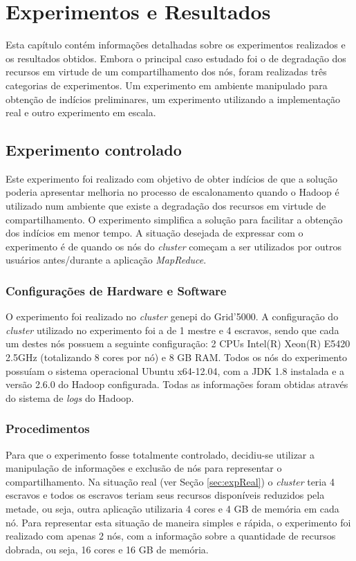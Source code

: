 \chapter{Experimentos e Resultados}
\label{chap:ExpRes}
Esta capítulo contém informações detalhadas sobre os experimentos realizados e os resultados obtidos. Embora o principal caso estudado foi o de degradação dos recursos em virtude de um compartilhamento dos nós, foram realizadas três categorias de experimentos. Um experimento em ambiente manipulado para obtenção de indícios preliminares, um experimento utilizando a implementação real e outro experimento em escala.

\section{Experimento controlado}
Este experimento foi realizado com objetivo de obter indícios de que a solução poderia apresentar melhoria no processo de escalonamento quando o Hadoop é utilizado num ambiente que existe a degradação dos recursos em virtude de compartilhamento. O experimento simplifica a solução para facilitar a obtenção dos indícios em menor tempo. A situação desejada de expressar com o experimento é de quando os nós do \textit{cluster} começam a ser utilizados por outros usuários antes/durante a aplicação \textit{MapReduce}.

\subsection{Configurações de Hardware e Software}
O experimento foi realizado no \textit{cluster} genepi do Grid'5000. A configuração do \textit{cluster} utilizado no experimento foi a de 1 mestre e 4 escravos, sendo que cada um destes nós possuem a seguinte configuração: 2 CPUs Intel(R) Xeon(R) E5420 2.5GHz (totalizando 8 cores por nó) e 8 GB RAM. Todos os nós do experimento possuíam o sistema operacional Ubuntu x64-12.04, com a JDK 1.8 instalada e a versão 2.6.0 do Hadoop configurada. Todas as informações foram obtidas através do sistema de \textit{logs} do Hadoop.

\subsection{Procedimentos}
Para que o experimento fosse totalmente controlado, decidiu-se utilizar a manipulação de informações e exclusão de nós para representar o compartilhamento. Na situação real (ver Seção \ref{sec:expReal}) o \textit{cluster} teria 4 escravos e todos os escravos teriam seus recursos disponíveis reduzidos pela metade, ou seja, outra aplicação utilizaria 4 cores e 4 GB de memória em cada nó. Para representar esta situação de maneira simples e rápida, o experimento foi realizado com apenas 2 nós, com a informação sobre a quantidade de recursos dobrada, ou seja, 16 cores e 16 GB de memória. 

